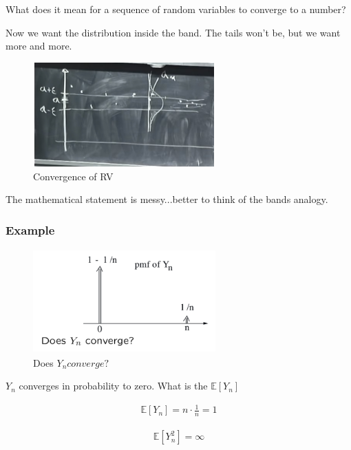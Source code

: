 \documentclass{article}
\begin{document}
What does it mean for a sequence of random variables to converge to a number?

 Now we want the distribution inside the band.  The tails won't be, but we want more and more.

\begin{figure}[ht]
\centering
\includegraphics[width=7cm, height=4cm]{images/L19/IMG_3317.jpeg}
\caption{Convergence of RV}
\end{figure}

The mathematical statement is messy...better to think of the bands analogy.

\subsubsection*{Example}


\begin{figure}[ht]
\centering
\includegraphics[width=7cm, height=4cm]{images/L19/IMG_1572.jpeg}
\caption{Does $Y_n converge?$}
\end{figure}

$Y_n$ converges in probability to zero.
What is the $\mathbb{E}[Y_n]$

\begin{align*}
    \mathbb{E}[Y_n] = n\cdot\frac{1}{n} = 1
\end{align*}

\begin{align*}
    \mathbb{E}[Y_n^2] = \infty
\end{align*}
\end{document}
